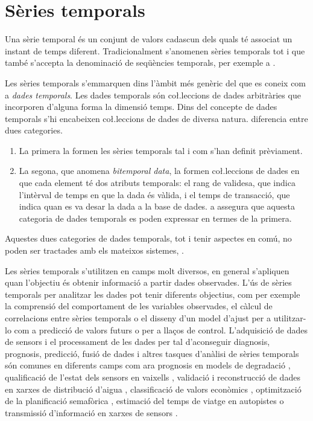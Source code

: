 \section{Sèries temporals}

Una sèrie temporal és un conjunt de valors cadascun dels quals té
associat un instant de temps diferent.  Tradicionalment s'anomenen
sèries temporals tot i que també s'accepta la denominació de
seqüències temporals, per exemple a \cite{last:hetland}.

Les sèries temporals s'emmarquen dins l'àmbit més genèric del que es
coneix com a \emph{dades temporals}. Les dades temporals són
co\l.leccions de dades arbitràries que incorporen d'alguna forma la
dimensió temps.  Dins del concepte de dades temporals s'hi encabeixen
co\l.leccions de dades de diversa natura. \textcite{assfalg08:thesis}
diferencia entre dues categories.
\begin{enumerate}
\item La primera la formen les sèries temporals tal i com s'han
  definit prèviament. 
\item La segona, que anomena \emph{bitemporal data}, la formen
  co\l.leccions de dades en que cada element té dos atributs
  temporals: el rang de validesa, que indica l'intèrval de temps en
  que la dada és vàlida, i el temps de transacció, que indica quan es
  va desar la dada a la base de dades.  \citeauthor{assfalg08:thesis}
  a \cite{assfalg08:thesis} assegura que aquesta categoria de dades
  temporals es poden expressar en termes de la primera.
\end{enumerate}
Aquestes dues categories de dades temporals, tot i tenir aspectes en
comú, no poden ser tractades amb els mateixos
sistemes, \parencite{schmidt95}.


Les sèries temporals s'utilitzen en camps molt diversos, en general
s'apliquen quan l'objectiu és obtenir informació a partir dades
observades. L'ús de sèries temporals per analitzar les dades pot tenir
diferents objectius, com per exemple la comprensió del comportament de
les variables observades, el càlcul de correlacions entre sèries
temporals o el disseny d'un model d'ajust per a utilitzar-lo com a
predicció de valors futurs o per a llaços de control.  L'adquisició de
dades de sensors i el processament de les dades per tal d'aconseguir
diagnosis, prognosis, predicció, fusió de dades i altres tasques
d'anàlisi de sèries temporals són comunes en diferents camps com ara
prognosis en models de degradació \parencite{yu11}, qualificació de
l'estat dels sensors en vaixells \parencite{palmer07}, validació i
reconstrucció de dades en xarxes de distribució
d'aigua \parencite{quevedo10}, classificació de valors
econòmics \parencite{dreyer95}, optimització de la planificació
semafòrica \parencite{last11}, estimació del temps de viatge en
autopistes \parencite{soriguera10} o transmissió d'informació en
xarxes de sensors \parencite{jainagrawal05,yaogehrke02}.



